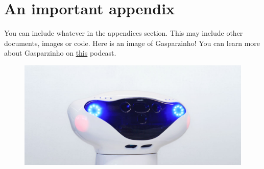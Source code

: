 \chapter{An important appendix}

You can include whatever in the appendices section. This may include other documents, images or code. Here is an image of Gasparzinho! You can learn more about Gasparzinho on \href{https://110.tecnico.ulisboa.pt/arquivos/episodio-58-gasparzinho/}{this} podcast.

\begin{figure}[!htb]
	\centering
	\includegraphics[width=.8\textwidth]{images/monarch.jpg}
\end{figure}